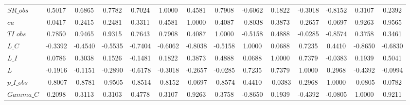 \begin{center}
\begin{longtable}{lccccccccccccc}
$SR\_obs         $	 & 	            0.5017	 & 	            0.6865	 & 	            0.7782	 & 	            0.7024	 & 	            1.0000	 & 	            0.4581	 & 	            0.7908	 & 	           -0.6062	 & 	            0.1822	 & 	           -0.3018	 & 	           -0.8152	 & 	            0.3107	 & 	            0.2392 \\ 
$cu              $	 & 	            0.0417	 & 	            0.2415	 & 	            0.2481	 & 	            0.3311	 & 	            0.4581	 & 	            1.0000	 & 	            0.4087	 & 	           -0.8038	 & 	            0.3873	 & 	           -0.2657	 & 	           -0.0697	 & 	            0.9263	 & 	            0.9565 \\ 
$TI\_obs         $	 & 	            0.7850	 & 	            0.9465	 & 	            0.9315	 & 	            0.7643	 & 	            0.7908	 & 	            0.4087	 & 	            1.0000	 & 	           -0.5158	 & 	            0.4888	 & 	           -0.0285	 & 	           -0.8574	 & 	            0.3758	 & 	            0.3461 \\ 
$L\_C            $	 & 	           -0.3392	 & 	           -0.4540	 & 	           -0.5535	 & 	           -0.7404	 & 	           -0.6062	 & 	           -0.8038	 & 	           -0.5158	 & 	            1.0000	 & 	            0.0688	 & 	            0.7235	 & 	            0.4410	 & 	           -0.8650	 & 	           -0.6830 \\ 
$L\_I            $	 & 	            0.0786	 & 	            0.3038	 & 	            0.1526	 & 	           -0.1481	 & 	            0.1822	 & 	            0.3873	 & 	            0.4888	 & 	            0.0688	 & 	            1.0000	 & 	            0.7379	 & 	           -0.0383	 & 	            0.1939	 & 	            0.5041 \\ 
$L               $	 & 	           -0.1916	 & 	           -0.1151	 & 	           -0.2890	 & 	           -0.6178	 & 	           -0.3018	 & 	           -0.2657	 & 	           -0.0285	 & 	            0.7235	 & 	            0.7379	 & 	            1.0000	 & 	            0.2968	 & 	           -0.4392	 & 	           -0.0994 \\ 
$p\_I\_obs       $	 & 	           -0.8007	 & 	           -0.8781	 & 	           -0.9505	 & 	           -0.8514	 & 	           -0.8152	 & 	           -0.0697	 & 	           -0.8574	 & 	            0.4410	 & 	           -0.0383	 & 	            0.2968	 & 	            1.0000	 & 	           -0.0805	 & 	            0.0782 \\ 
$Gamma\_C        $	 & 	            0.2098	 & 	            0.3113	 & 	            0.3103	 & 	            0.4778	 & 	            0.3107	 & 	            0.9263	 & 	            0.3758	 & 	           -0.8650	 & 	            0.1939	 & 	           -0.4392	 & 	           -0.0805	 & 	            1.0000	 & 	            0.9211 \\ 

\end{longtable}
\end{center}
